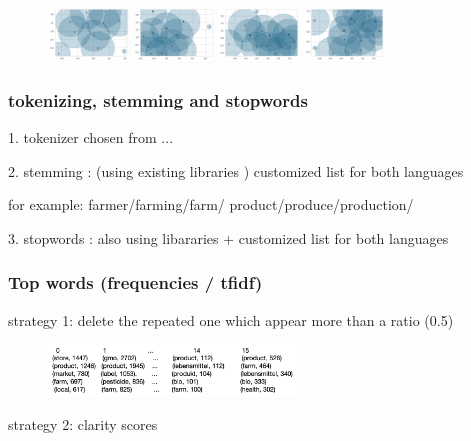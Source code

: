 \documentclass{tum-presentation}
\begin{document}
\begin{frame}[fragile]
\begin{center}
\begin{figure}[t]
        \includegraphics[width=0.19\textwidth]{figures/k10.png}
        \includegraphics[width=0.19\textwidth]{figures/k12.png}
        \includegraphics[width=0.19\textwidth]{figures/k14.png}
        \includegraphics[width=0.19\textwidth]{figures/k16.png}
        
      \end{figure}
    \end{center}
  
    \end{frame}

    \begin{frame}[fragile]
      \frametitle{tokenizing, stemming and stopwords}
      \begin{description}
        \item 1. tokenizer chosen from ... 
        \item 2. stemming : (using existing libraries ) customized list for both languages
        \item for example: farmer/farming/farm/  product/produce/production/ 
        \item 3. stopwords : also using libararies + customized list for both languages
      \end{description}

     
      \end{frame}
    \begin{frame}[fragile]
      \frametitle{Top words (frequencies / tfidf)}
strategy 1: delete the repeated one which appear more than a ratio (0.5)

      \begin{center}
        \begin{figure}[t]
          \includegraphics[width=0.6\textwidth]{figures/naivetopwords.png}
        \end{figure}
      \end{center}
      strategy 2: clarity scores
      \end{frame}
\end{document}

